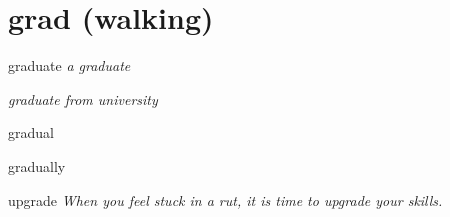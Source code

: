 \chapter{grad (walking)}

\begin{word}{graduate}
    \textit{a graduate}

    \textit{graduate from university}
\end{word}

\begin{word}{gradual}
\end{word}

\begin{word}{gradually}
\end{word}

\begin{word}{upgrade}
    \textit{When you feel stuck in a rut, it is time to upgrade your skills.}
\end{word}